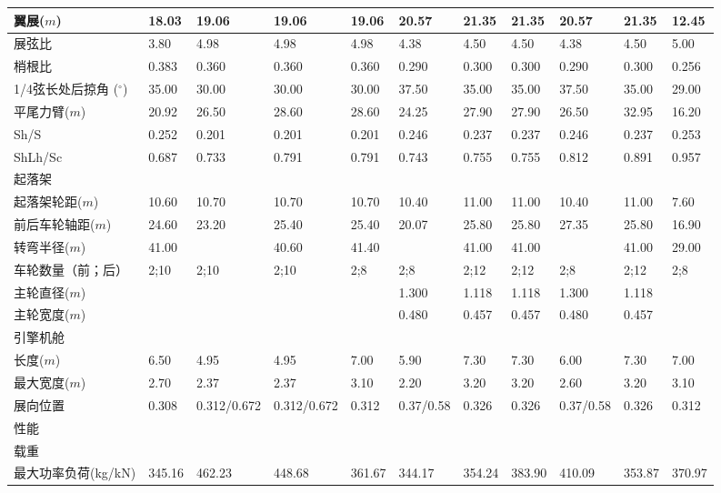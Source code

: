 \documentclass[12pt,a4paper]{report}
\begin{document}
\begin{landscape}
\begin{center}
\begin{longtable}{|p{1.5cm}|p{1.3cm}|p{1.1cm}|p{1.1cm}|p{1.1cm}|p{1.1cm}|p{1.1cm}|p{1.1cm}|p{1.1cm}|p{1.1cm}|p{1.1cm}|}
翼展($m$)	&	18.03	&	19.06	&	19.06	&	19.06	&	20.57	&	21.35	&	21.35	&	20.57	&	21.35	&	12.45\\ \hline
展弦比	&	3.80	&	4.98	&	4.98	&	4.98	&	4.38	&	4.50	&	4.50	&	4.38	&	4.50	&	5.00\\ \hline
梢根比	&	0.383	&	0.360	&	0.360	&	0.360	&	0.290	&	0.300	&	0.300	&	0.290	&	0.300	&	0.256\\ \hline
1/4弦长处后掠角 ($^\circ$)	&	35.00	&	30.00	&	30.00	&	30.00	&	37.50	&	35.00	&	35.00	&	37.50	&	35.00	&	29.00\\ \hline
平尾力臂($m$)	&	20.92	&	26.50	&	28.60	&	28.60	&	24.25	&	27.90	&	27.90	&	26.50	&	32.95	&	16.20\\ \hline
Sh/S	&	0.252	&	0.201	&	0.201	&	0.201	&	0.246	&	0.237	&	0.237	&	0.246	&	0.237	&	0.253\\ \hline
ShLh/Sc	&	0.687	&	0.733	&	0.791	&	0.791	&	0.743	&	0.755	&	0.755	&	0.812	&	0.891	&	0.957\\ \hline
起落架	&		&		&		&		&		&		&		&		&		&	\\ \hline
起落架轮距($m$)	&	10.60	&	10.70	&	10.70	&	10.70	&	10.40	&	11.00	&	11.00	&	10.40	&	11.00	&	7.60\\ \hline
前后车轮轴距($m$)	&	24.60	&	23.20	&	25.40	&	25.40	&	20.07	&	25.80	&	25.80	&	27.35	&	25.80	&	16.90\\ \hline
转弯半径($m$)	&	41.00	&		&	40.60	&	41.40	&		&	41.00	&	41.00	&		&	41.00	&	29.00\\ \hline
车轮数量（前；后）	&	2;10	&	2;10	&	2;10	&	2;8	&	2;8	&	2;12	&	2;12	&	2;8	&	2;12	&	2;8\\ \hline
主轮直径($m$)	&		&		&		&		&	1.300	&	1.118	&	1.118	&	1.300	&	1.118	&	\\ \hline
主轮宽度($m$)	&		&		&		&		&	0.480	&	0.457	&	0.457	&	0.480	&	0.457	&	\\ \hline
引擎机舱	&		&		&		&		&		&		&		&		&		&	\\ \hline
长度($m$)	&	6.50	&	4.95	&	4.95	&	7.00	&	5.90	&	7.30	&	7.30	&	6.00	&	7.30	&	7.00\\ \hline
最大宽度($m$)	&	2.70	&	2.37	&	2.37	&	3.10	&	2.20	&	3.20	&	3.20	&	2.60	&	3.20	&	3.10\\ \hline
展向位置	&	0.308	&	0.312/0.672	&	0.312/0.672	&	0.312	&	0.37/0.58	&	0.326	&	0.326	&	0.37/0.58	&	0.326	&	0.312\\ \hline
性能	&		&		&		&		&		&		&		&		&		&	\\ \hline
载重	&		&		&		&		&		&		&		&		&		&	\\ \hline
最大功率负荷(kg/kN)	&	345.16	&	462.23	&	448.68	&	361.67	&	344.17	&	354.24	&	383.90	&	410.09	&	353.87	&	370.97\\ \hline

\end{longtable}
\end{center}
\end{landscape}
\end{document}
